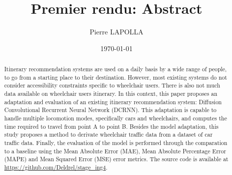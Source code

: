 \documentclass[10pt]{article}
\title{Premier rendu: Abstract}
\author{Pierre LAPOLLA}
\date{\today}
\begin{document}
    \maketitle
    \begin{abstract}
        Itinerary recommendation systems are used on a daily basis by a wide range of people, to go from a starting place to their destination.
        However, most existing systems do not consider accessibility constraints specific to wheelchair users.
        There is also not much data available on wheelchair users itinerary.
        In this context, this paper proposes an adaptation and evaluation of an existing itinerary recommendation system: Diffusion Convolutional Recurrent Neural Network (DCRNN).
        This adaptation is capable to handle multiple locomotion modes, specifically cars and wheelchairs, and computes the time required to travel from point A to point B.
        Besides the model adaptation, this study proposes a method to derivate wheelchair traffic data from a dataset of car traffic data.
        Finally, the evaluation of the model is performed through the comparation to a baseline using the Mean Absolute Error (MAE), Mean Absolute Percentage Error (MAPE) and Mean Squared Error (MSE) error metrics.
        The source code is available at \url{https://github.com/Deldrel/stage_ing4}.
    \end{abstract}
\end{document}
